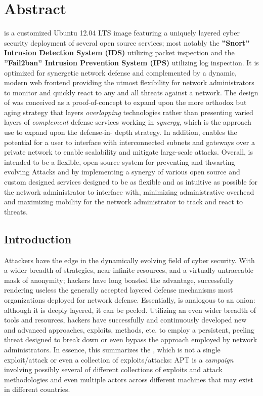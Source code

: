 \documentclass[12pt,letterpaper,titlepage]{report}
\begin{document}
{
\setlength{\parskip}{1em}
\chapter{Abstract}

\scarletshield is a customized Ubuntu 12.04 LTS image featuring a uniquely
layered cyber security deployment of several open source services; most notably
the \textbf{''Snort'' Intrusion Detection System (IDS)} utilizing packet inspection and the
\textbf{''Fail2ban'' Intrusion Prevention System (IPS)} utilizing log inspection.  It is
optimized for synergetic network defense and complemented by a dynamic, modern
web frontend providing the utmost flexibility for network administrators to
monitor and quickly react to any and all threats against a network.  The design
of  was conceived as a proof-of-concept to expand upon the more
orthodox but aging \did strategy that layers \emph{overlapping}
technologies rather than presenting varied layers of \emph{complement} defense services
working in \emph{synergy}, which is the approach use to expand upon the defense-in-
depth strategy.  In addition, \scarletshield enables the potential for a user to
interface with interconnected subnets and gateways over a private network to
enable scalability and mitigate large-scale attacks.  Overall, \scarletshield is
intended to be a flexible, open-source system for preventing and thwarting
evolving \ddos Attacks and \apt
by implementing a synergy of various open source and custom
designed services designed to be as flexible and as intuitive as possible for
the network administrator to interface with, minimizing administrative overhead
and maximizing mobility for the network administrator to track and react to
threats.

\section{Introduction}

Attackers have the edge in the dynamically evolving field of cyber security.
With a wider breadth of strategies, near-infinite resources, and a virtually
untraceable mask of anonymity; hackers have long boasted the advantage,
successfully rendering useless the generally accepted \did layered
defense mechanisms most organizations deployed for network defense.
Essentially, is analogous to an onion: although it is deeply
layered, it can be peeled.  Utilizing an even wider breadth of tools and
resources, hackers have successfully and continuously developed new and advanced
approaches, exploits, \dos methods, etc. to employ a
persistent, peeling threat designed to break down or even bypass the \did 
approach employed by network administrators.  In essence, this summarizes
the \apt, which is not a single exploit/attack or even a
collection of exploits/attacks: APT is a \emph{campaign} involving possibly several of
different collections of exploits and attack methodologies and even multiple
actors across different machines that may exist in different countries.

}
\end{document}

